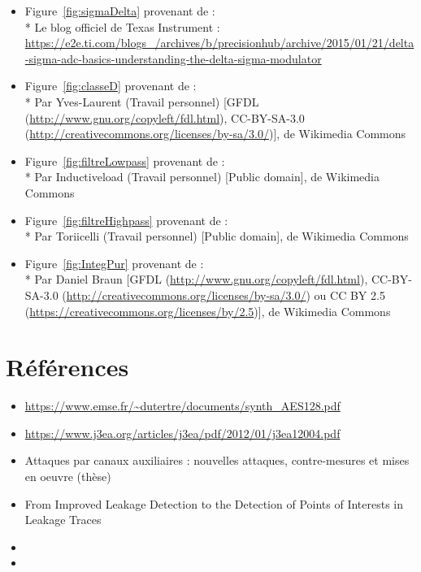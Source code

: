 \documentclass[10pt, oneside, a4paper]{article}
\begin{document}
\begin{itemize}
\item Figure~\ref{fig:sigmaDelta} provenant de :\\*
Le blog officiel de Texas Instrument :
\url{https://e2e.ti.com/blogs_/archives/b/precisionhub/archive/2015/01/21/delta-sigma-adc-basics-understanding-the-delta-sigma-modulator}

\item Figure~\ref{fig:classeD} provenant de :\\*
Par Yves-Laurent (Travail personnel) [GFDL (\url{http://www.gnu.org/copyleft/fdl.html}),
CC-BY-SA-3.0 (\url{http://creativecommons.org/licenses/by-sa/3.0/})], de Wikimedia Commons

\item Figure~\ref{fig:filtreLowpass} provenant de :\\*
Par Inductiveload (Travail personnel) [Public domain], de Wikimedia Commons

\item Figure~\ref{fig:filtreHighpass} provenant de :\\*
Par Toriicelli (Travail personnel) [Public domain], de Wikimedia Commons

\item Figure~\ref{fig:IntegPur} provenant de :\\*
Par Daniel Braun [GFDL (\url{http://www.gnu.org/copyleft/fdl.html}),
CC-BY-SA-3.0 (\url{http://creativecommons.org/licenses/by-sa/3.0/}) ou
CC BY 2.5 (\url{https://creativecommons.org/licenses/by/2.5})], de Wikimedia Commons
\end{itemize}

\section*{Références}

\begin{itemize}
\item \url{https://www.emse.fr/~dutertre/documents/synth_AES128.pdf}
\item \url{https://www.j3ea.org/articles/j3ea/pdf/2012/01/j3ea12004.pdf}
\item Attaques par canaux auxiliaires : nouvelles attaques, contre-mesures et mises en oeuvre (thèse)
\item From Improved Leakage Detection to the Detection of Points of Interests in Leakage Traces
\item 
\item 
\end{itemize}
\end{document}
